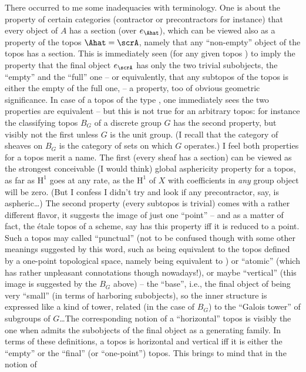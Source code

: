There occurred to me some inadequacies with terminology. One is about
the property of certain categories (contractor or precontractors for
instance) that every object of $A$ has a section (over $e_\Ahat$),
which can be viewed also as a property of the topos $\Ahat=\scrA$,
namely that any ``non-empty'' object of the topos has a section. This
is immediately seen (for any given topos \scrA) to imply the property
that the final object $e_\scrA$ has only the two trivial subobjects,
the ``empty'' and the ``full'' one -- or equivalently, that any
subtopos of the topos is either the empty of the full one, -- a
property, too of obvious geometric significance. In case of a topos of
the type \Ahat, one immediately sees the two properties are equivalent
-- but this is not true for an arbitrary topos: for
instance the classifying topos $B_G$ of a discrete group $G$ has the
second property, but visibly not the first unless $G$ is the unit
group. (I recall that the category of sheaves on $B_G$ is the category
\Gsets{} of sets on which $G$ operates.) I feel both properties for a
topos merit a name. The first (every sheaf has a section) can be
viewed as the strongest conceivable (I would think) global asphericity
property for a topos, as far as $\mathrm H^1$ goes at any rate, as the
$\mathrm H^1$ of $X$ with coefficients in \emph{any} group object will
be zero. (But I confess I didn't try and look if any precontractor,
say, is aspheric\ldots) The second property (every subtopos is
trivial) comes with a rather different flavor, it suggests the image
of just one ``point'' -- and as a matter of fact, the étale topos of a
scheme, say has this property if{f} it is reduced to a point. Such a
topos may called ``punctual'' (not to be confused though with some
other meanings suggested by this word, such as being equivalent to the
topos defined by a one-point topological space, namely \scrA{} being
equivalent to \Sets) or ``atomic'' (which has rather unpleasant
connotations though nowadays!), or maybe ``vertical'' (this image is
suggested by the $B_G$ above) -- the ``base'', i.e., the final object
of \scrA{} being very ``small'' (in terms of harboring subobjects), so
the inner structure is expressed like a kind of tower, related (in the
case of $B_G$) to the ``Galois tower'' of subgroups of $G$\ldots The
corresponding notion of a ``horizontal'' topos is visibly the one when
\scrA{} admits the subobjects of the final object as a generating
family. In terms of these definitions, a topos is horizontal and
vertical if{f} it is either the ``empty'' or the ``final'' (or
``one-point'') topos. This brings to mind that in the notion of
